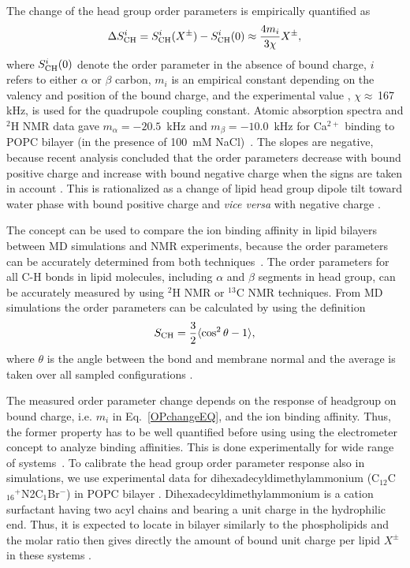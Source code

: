 \documentclass[aip,jcp,twocolumn]{revtex4}
\begin{document}
The change of the head group order parameters is empirically quantified
as~\cite{seelig87,ferreira16}
\begin{equation}\label{OPchangeEQ}
  \Delta S_{\rm{CH}}^{i}= S_{\rm{CH}}^{i}(X^\pm)-S_{\rm{CH}}^{i}(0) \approx \frac{4m_i }{3\chi}X^\pm,
\end{equation}
where $S_{\rm{CH}}^{i}(0)$ denote the order parameter in the absence of bound charge,
$i$ refers to either $\alpha$ or $\beta$ carbon,
$m_i$ is an empirical constant depending on the valency and position of the bound charge,
and the experimental value \cite{seelig77,davis83}, $\chi \approx$\,167\,kHz, is used for the quadrupole coupling constant.
Atomic absorption spectra and $^2$H NMR data gave
$m_\alpha=-20.5$~kHz  and $m_\beta=-10.0$~kHz for Ca$^{2+}$ binding to POPC
bilayer (in the presence of 100~mM NaCl)~\cite{altenbach84,ollila16,catte16}.
The slopes are negative, because recent analysis concluded 
that the order parameters decrease with bound positive charge 
and increase with bound negative charge when the signs are taken 
in account \cite{ollila16,catte16}. This is rationalized as a change
of lipid head group dipole tilt toward water phase with bound positive
charge and {\it vice versa} with negative charge \cite{seelig87}. 

The concept can be used to compare the ion binding affinity in lipid 
bilayers between MD simulations and  NMR experiments, because the order
parameters can be accurately determined from both techniques~\cite{ollila16}.
The order parameters for all C-H bonds in lipid molecules, including
$\alpha$ and $\beta$ segments in head group, can be accurately measured
by using $^2$H NMR or $^{13}$C NMR techniques. From MD simulations the
order parameters can be calculated by using the definition
\begin{equation}\label{OP}
S_{\rm CH}=\frac{3}{2}\langle \cos^2\theta -1 \rangle,
\end{equation}
where $\theta$ is the angle between the bond and membrane
normal and the average is taken over all sampled configurations \cite{ollila16}.

The measured order parameter change depends on the response of 
headgroup on bound charge, i.e. $m_i$ in Eq.~\ref{OPchangeEQ},
and the ion binding affinity. Thus, the former property has to be
well quantified before using using the electrometer concept to
analyze binding affinities. This is done experimentally for wide range
of systems~\cite{seelig87,beschiasvili91}. To calibrate 
the head group order parameter response also in simulations,
we use experimental data for dihexadecyldimethylammonium (C$_{12}$C$_{16}$$^+$N2C$_1$Br$^-$)
in POPC bilayer \cite{scherer89}. Dihexadecyldimethylammonium
is a cation surfactant having two acyl chains and bearing a unit
charge in the hydrophilic end. Thus, it is expected to locate
in bilayer similarly to the phospholipids and the molar ratio then 
gives directly the amount of bound unit charge per lipid $X^\pm$ in these systems \cite{scherer87}.
\end{document}
